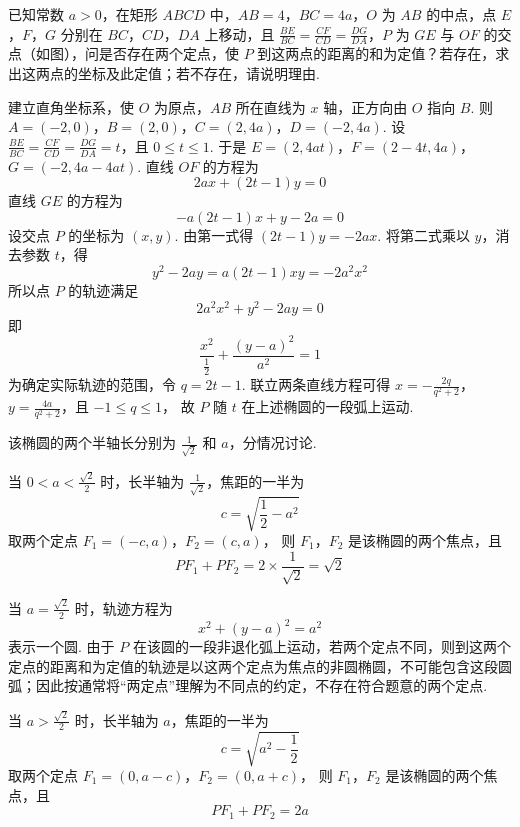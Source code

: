 \begin{problem}
已知常数 \(a>0\)，在矩形 \(ABCD\) 中，\(AB=4\)，\(BC=4a\)，\(O\) 为 \(AB\) 的中点，点 \(E\)，\(F\)，\(G\) 分别在 \(BC\)，\(CD\)，\(DA\) 上移动，且 \(\frac{BE}{BC}=\frac{CF}{CD}=\frac{DG}{DA}\)，\(P\) 为 \(GE\) 与 \(OF\) 的交点（如图），问是否存在两个定点，使 \(P\) 到这两点的距离的和为定值？若存在，求出这两点的坐标及此定值；若不存在，请说明理由.


\begin{solution}
建立直角坐标系，使 \(O\) 为原点，\(AB\) 所在直线为 \(x\) 轴，正方向由 \(O\) 指向 \(B\). 则
\(A=(-2,0)\)，\(B=(2,0)\)，\(C=(2,4a)\)，\(D=(-2,4a)\).
设 \(\frac{BE}{BC}=\frac{CF}{CD}=\frac{DG}{DA}=t\)，且 \(0\leqslant t\leqslant1\).
于是
\(E=(2,4at)\)，\(F=(2-4t,4a)\)，\(G=(-2,4a-4at)\).
直线 \(OF\) 的方程为
\[
2ax+(2t-1)y=0
\]
直线 \(GE\) 的方程为
\[
-a(2t-1)x+y-2a=0
\]
设交点 \(P\) 的坐标为 \((x,y)\). 由第一式得 \((2t-1)y=-2ax\). 将第二式乘以 \(y\)，消去参数 \(t\)，得
\[
y^2-2ay=a(2t-1)xy=-2a^2x^2
\]
所以点 \(P\) 的轨迹满足
\[
2a^2x^2+y^2-2ay=0
\]
即
\[
\frac{x^2}{\frac12}+\frac{(y-a)^2}{a^2}=1
\]
为确定实际轨迹的范围，令 \(q=2t-1\). 联立两条直线方程可得
\(x=-\frac{2q}{q^2+2}\)，\(y=\frac{4a}{q^2+2}\)，且 \(-1\leqslant q\leqslant1\)，
故 \(P\) 随 \(t\) 在上述椭圆的一段弧上运动.

该椭圆的两个半轴长分别为 \(\frac1{\sqrt2}\) 和 \(a\)，分情况讨论.

当 \(0<a<\frac{\sqrt2}{2}\) 时，长半轴为 \(\frac1{\sqrt2}\)，焦距的一半为
\[
c=\sqrt{\frac12-a^2}
\]
取两个定点
\(F_1=(-c,a)\)，\(F_2=(c,a)\)，
则 \(F_1\)，\(F_2\) 是该椭圆的两个焦点，且
\[
PF_1+PF_2=2\times\frac1{\sqrt2}=\sqrt2
\]

当 \(a=\frac{\sqrt2}{2}\) 时，轨迹方程为
\[
x^2+(y-a)^2=a^2
\]
表示一个圆. 由于 \(P\) 在该圆的一段非退化弧上运动，若两个定点不同，则到这两个定点的距离和为定值的轨迹是以这两个定点为焦点的非圆椭圆，不可能包含这段圆弧；因此按通常将“两定点”理解为不同点的约定，不存在符合题意的两个定点.

当 \(a>\frac{\sqrt2}{2}\) 时，长半轴为 \(a\)，焦距的一半为
\[
c=\sqrt{a^2-\frac12}
\]
取两个定点
\(F_1=(0,a-c)\)，\(F_2=(0,a+c)\)，
则 \(F_1\)，\(F_2\) 是该椭圆的两个焦点，且
\[
PF_1+PF_2=2a
\]
\end{solution}
\end{problem}
